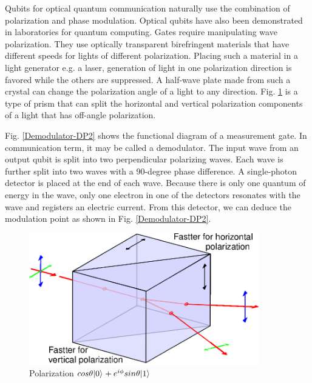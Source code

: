 \documentclass[oneside, letter, 12pt]{book}
\begin{document}
Qubits for optical quantum communication naturally use the combination of polarization and phase modulation. Optical qubits have also been demonstrated in laboratories for quantum computing. Gates require manipulating wave polarization. They use optically transparent birefringent materials that have different speeds for lights of different polarization. Placing such a material in a light generator e.g. a laser, generation of light in one polarization direction is favored while the others are suppressed. A half-wave plate made from such a crystal can change the polarization angle of a light to any direction. Fig. \ref{Polarization-splitter} is a type of prism that can split the horizontal and vertical polarization components of a light that has off-angle polarization.

Fig. \ref{Demodulator-DP2} shows the functional diagram of a measurement gate. In communication term, it may be called a demodulator. The input wave from an output qubit is split into two perpendicular polarizing waves. Each wave is further split into two waves with a 90-degree phase difference. A single-photon detector is placed at the end of each wave. Because there is only one quantum of energy in the wave, only one electron in one of the detectors resonates with the wave and registers an electric current. From this detector, we can deduce the modulation point as shown in Fig. \ref{Demodulator-DP2}.

\begin{figure}[h]
\includegraphics[width=10cm]{pic/polarization-prism.eps}
\caption{Polarization $cos{\theta} \vert {0} \rangle_{} + e^{i \phi} sin{\theta} \vert {1} \rangle_{}$}
\label{Polarization-splitter}
\end{figure}
\end{document}
